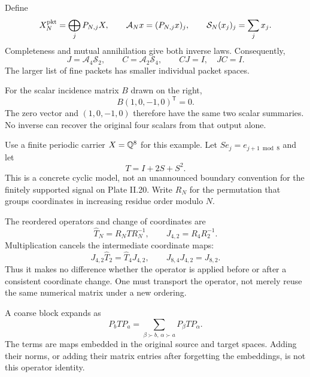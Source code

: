 Define
\[
X_N^{\rm pkt}=\bigoplus_j P_{N,j}X,
\qquad
\mathcal A_Nx=(P_{N,j}x)_j,
\qquad
\mathcal S_N(x_j)_j=\sum_jx_j.
\]
Completeness and mutual annihilation give both inverse laws. Consequently,
\[
J=\mathcal A_4\mathcal S_2,\qquad C=\mathcal A_2\mathcal S_4,
\qquad CJ=I,\quad JC=I.
\]
The larger list of fine packets has smaller individual packet spaces.

For the scalar incidence matrix $B$ drawn on the right,
\[
B(1,0,-1,0)^\mathsf T=0.
\]
The zero vector and $(1,0,-1,0)$ therefore have the same two scalar summaries. No inverse can recover the original four scalars from that output alone.


Use a finite periodic carrier $X=\mathbb Q^8$ for this example. Let $Se_j=e_{j+1\bmod8}$ and let
\[
T=I+2S+S^2.
\]
This is a concrete cyclic model, not an unannounced boundary convention for the finitely supported signal on Plate II.20. Write $R_N$ for the permutation that groups coordinates in increasing residue order modulo $N$.


The reordered operators and change of coordinates are
\[
\widehat T_N=R_NTR_N^{-1},\qquad J_{4,2}=R_4R_2^{-1}.
\]
Multiplication cancels the intermediate coordinate maps:
\[
J_{4,2}\widehat T_2=\widehat T_4J_{4,2},\qquad
J_{8,4}J_{4,2}=J_{8,2}.
\]
Thus it makes no difference whether the operator is applied before or after a consistent coordinate change. One must transport the operator, not merely reuse the same numerical matrix under a new ordering.

A coarse block expands as
\[
P_bTP_a=\sum_{\beta\succ b,\,\alpha\succ a}P_\beta TP_\alpha.
\]
The terms are maps embedded in the original source and target spaces. Adding their norms, or adding their matrix entries after forgetting the embeddings, is not this operator identity.


